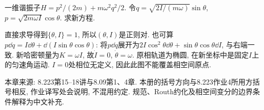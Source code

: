 \begin{example}
一维谐振子$H=p^2/(2m)+m\omega^2q^2/2$. 令$q=\sqrt{2I/(m\omega)}\sin\theta$, $p=\sqrt{2m\omega I}\cos\theta$. 求新方程.
\end{example}
\begin{solution}
直接求导得到$\{\theta,I\}=1$, 所以$(\theta,I)$是正则对. 也可算$p\dd q=I\dd\theta+\dd(I\sin\theta\cos\theta)$: 将$p\dd q$展开为$2I\cos^2\theta\dd\theta+\sin\theta\cos\theta\dd I$, 与右端一致. 新哈密顿量为$K=\omega I$, 故$\dot I=0$, $\dot\theta=\omega$. 原相轨道为椭圆, 在新坐标中是固定$I$上的匀速角运动. $I=0$处相位无定义, 因此此图不能覆盖相空间原点.
\end{solution}


本章来源: 8.223第15--18讲与8.09第1、4章. 本册的括号方向与8.223作业4所用方括号相反, 作业译写处会说明, 不混用约定. 规范、Routh约化及相空间变分的边界条件解释为中文补充.
